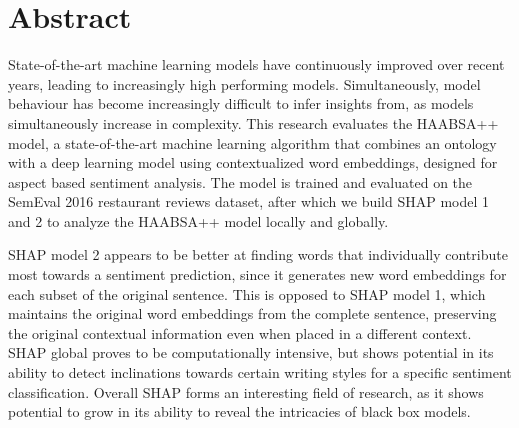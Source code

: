 \chapter*{Abstract}
State-of-the-art machine learning models have continuously improved over recent years, leading to increasingly high performing models. Simultaneously, model behaviour has become increasingly difficult to infer insights from, as models simultaneously increase in complexity. This research evaluates the HAABSA++ model, a state-of-the-art machine learning algorithm that combines an ontology with a deep learning model using contextualized word embeddings, designed for aspect based sentiment analysis. The model is trained and evaluated on the SemEval 2016 restaurant reviews dataset, after which we build SHAP model 1 and 2 to analyze the HAABSA++ model locally and globally.

SHAP model 2 appears to be better at finding words that individually contribute most towards a sentiment prediction, since it generates new word embeddings for each subset of the original sentence. This is opposed to SHAP model 1, which maintains the original word embeddings from the complete sentence, preserving the original contextual information even when placed in a different context. SHAP global proves to be computationally intensive, but shows potential in its ability to detect inclinations towards certain writing styles for a specific sentiment classification. Overall SHAP forms an interesting field of research, as it shows potential to grow in its ability to reveal the intricacies of black box models.